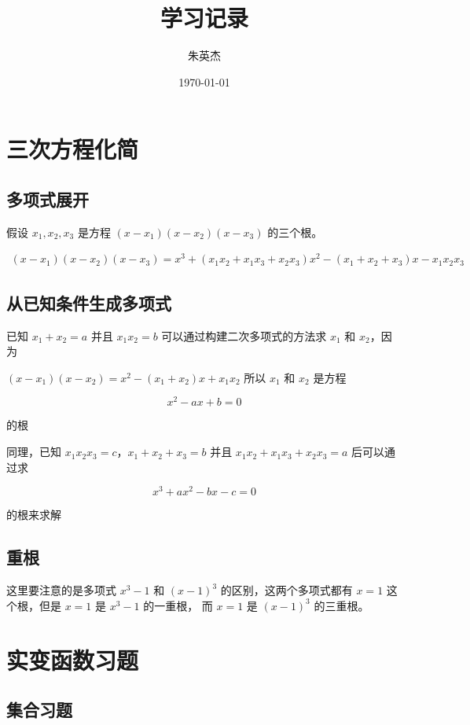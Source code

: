 \documentclass[12pt,a4paper]{ctexart}
\title{学习记录}
\author{朱英杰}
\date{\today}
\begin{document}
\maketitle

\section{三次方程化简}

\subsection{多项式展开}

假设 $x_1, x_2, x_3$ 是方程 $(x-x_1)(x-x_2)(x-x_3)$ 的三个根。

\begin{align*}
   (x-x_1)(x-x_2)(x-x_3) = x^3 +(x_1x_2 + x_1x_3 + x_2x_3)x^2 - (x_1 + x_2 + x_3)x - x_1x_2x_3
\end{align*}

\subsection{从已知条件生成多项式}

已知 $x_1 + x_2 = a$ 并且 $x_1 x_2 = b$ 可以通过构建二次多项式的方法求 $x_1$ 和 $x_2$，因为

$(x-x_1)(x-x_2) = x^2 - (x_1 + x_2)x + x_1 x_2$ 所以 $x_1$ 和 $x_2$ 是方程

\[
x^2 - ax + b = 0
\]

的根

同理，已知 $x_1x_2x_3 = c$，$x_1 + x_2 + x_3 = b$ 并且 $x_1x_2 + x_1x_3 + x_2x_3 = a$ 后可以通过求

\[
x^3 + ax^2 - bx -c = 0
\]

的根来求解

\subsection{重根}

这里要注意的是多项式 $x^3 - 1$ 和 $(x-1)^3$ 的区别，这两个多项式都有 $x=1$ 这个根，但是 $x=1$ 是 $x^3-1$ 的一重根，
而 $x=1$ 是 $(x-1)^3$ 的三重根。

\section{实变函数习题}

\subsection{集合习题}
\end{document}
